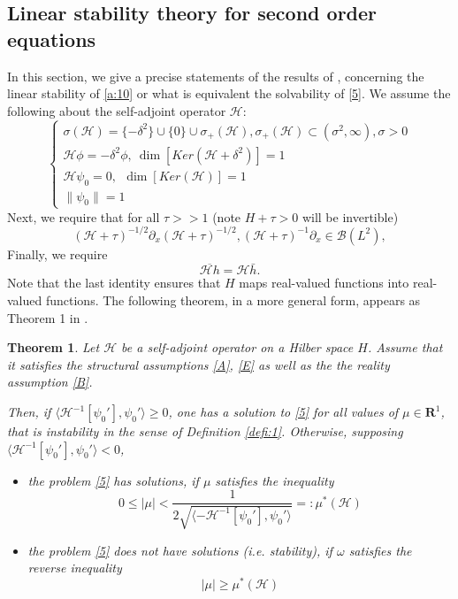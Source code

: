 \documentclass[final,11pt,leqno]{amsart}
\newtheorem{theorem}{Theorem}
\begin{document}
\subsection{Linear stability theory   for second order equations} In this section, we give a precise statements of the results of \cite{SS1},
concerning the linear stability of \eqref{a:10} or what is equivalent the solvability of \eqref{5}.
 We assume the following about the self-adjoint operator ${\mathcal H}$:
 \begin{equation}
\label{A}
\left\{ \begin{array}{l}
{\sigma}({\mathcal H})=\{-{\delta}^2\} \cup \{0\}\cup {\sigma}_+({\mathcal H}), {\sigma}_+({\mathcal H})\subset ({\sigma}^2, \infty), {\sigma}>0\\
 {\mathcal H} \phi=-{\delta}^2 \phi,  \ \dim[Ker({\mathcal H}+{\delta}^2)]=1 \\
  {\mathcal H} \psi_0=0, \ \  \dim[Ker({\mathcal H})]=1\\
   \|\psi_0\|=1
\end{array}
\right.
\end{equation}
 Next, we require that for all $\tau>>1$ (note $H+\tau>0$ will be invertible)
\begin{equation}
 \label{E}
   ({\mathcal H}+\tau)^{-1/2} {\partial}_x ({\mathcal H}+\tau)^{-1/2}, ({\mathcal H}+\tau)^{-1} {\partial}_x \in {\mathcal B}(L^2),
 \end{equation}
Finally, we require
\begin{equation}
\label{B}
  \overline{{\mathcal H} h}={\mathcal H} \bar{h}.
\end{equation}
Note that the last identity ensures that $H$ maps real-valued functions into real-valued functions.
The following theorem, in a more general form,  appears as Theorem 1 in \cite{SS1}.
\begin{theorem}
\label{theo:5}
 Let ${\mathcal H}$  be a self-adjoint operator on
 a Hilber space $H$. Assume that  it satisfies the structural assumptions \eqref{A}, \eqref{E} as well as the
  the reality assumption \eqref{B}.

Then, if ${\langle {{\mathcal H}^{-1}[\psi_0']},{\psi_0'} \rangle}\geq  0$, one has a solution to \eqref{5} for all values  of $\mu\in {\mathbf R^1}$, that is instability
in the sense of Definition \ref{defi:1}.
 Otherwise, supposing ${\langle {{\mathcal H}^{-1}[\psi_0']},{\psi_0'} \rangle}<0$,
 \begin{itemize}
 \item
  the problem \eqref{5} has solutions, if
   $\mu$ satisfies the inequality
 \begin{equation}
 \label{m:2}
 0\leq |\mu|<
 \frac{1}{2\sqrt{{\langle {-{\mathcal H}^{-1}[\psi_0']},{\psi_0'} \rangle}}}=:\mu^*({\mathcal H})
 \end{equation}
 \item  the problem \eqref{5} does not have solutions (i.e. stability), if
   ${\omega}$ satisfies the reverse inequality
   \begin{equation}
 \label{m:3}
  |\mu|\geq  \mu^*({\mathcal H})
 \end{equation}
 \end{itemize}
 \end{theorem}
\end{document}
